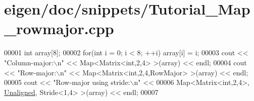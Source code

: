 \hypertarget{eigen_2doc_2snippets_2_tutorial___map__rowmajor_8cpp_source}{}\section{eigen/doc/snippets/\+Tutorial\+\_\+\+Map\+\_\+rowmajor.cpp}
\label{eigen_2doc_2snippets_2_tutorial___map__rowmajor_8cpp_source}

\begin{DoxyCode}
00001 \textcolor{keywordtype}{int} array[8];
00002 \textcolor{keywordflow}{for}(\textcolor{keywordtype}{int} i = 0; i < 8; ++i) array[i] = i;
00003 cout << \textcolor{stringliteral}{"Column-major:\(\backslash\)n"} << Map<Matrix<int,2,4> >(array) << endl;
00004 cout << \textcolor{stringliteral}{"Row-major:\(\backslash\)n"} << Map<Matrix<int,2,4,RowMajor> >(array) << endl;
00005 cout << \textcolor{stringliteral}{"Row-major using stride:\(\backslash\)n"} <<
00006   Map<Matrix<int,2,4>, \hyperlink{group__enums_gga45fe06e29902b7a2773de05ba27b47a1ac935220b4c844108e183ebe30a4d5204}{Unaligned}, Stride<1,4> >(array) << endl;
00007 
\end{DoxyCode}
